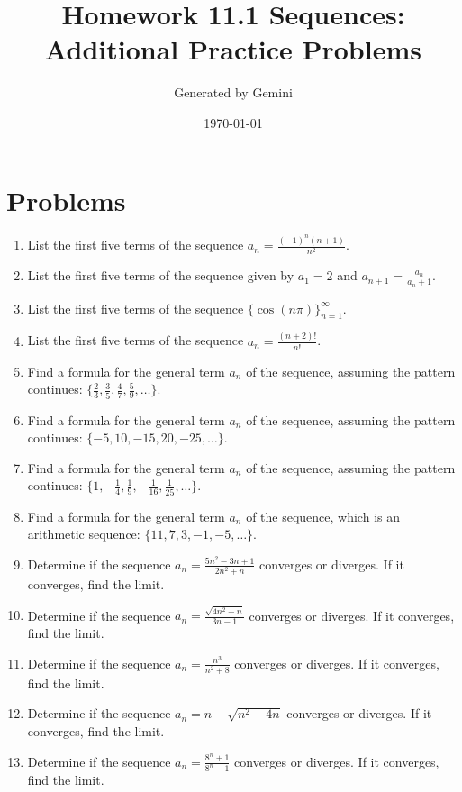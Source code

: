 \documentclass{article}
\title{Homework 11.1 Sequences: Additional Practice Problems}
\author{Generated by Gemini}
\date{\today}
\begin{document}
\maketitle

\section*{Problems}

\begin{enumerate}
    \item List the first five terms of the sequence $a_n = \frac{(-1)^n(n+1)}{n^2}$.
    \item List the first five terms of the sequence given by $a_1 = 2$ and $a_{n+1} = \frac{a_n}{a_n + 1}$.
    \item List the first five terms of the sequence $\{ \cos(n\pi) \}_{n=1}^{\infty}$.
    \item List the first five terms of the sequence $a_n = \frac{(n+2)!}{n!}$.

    \item Find a formula for the general term $a_n$ of the sequence, assuming the pattern continues: 
    $\{ \frac{2}{3}, \frac{3}{5}, \frac{4}{7}, \frac{5}{9}, \dots \}$.
    \item Find a formula for the general term $a_n$ of the sequence, assuming the pattern continues:
    $\{ -5, 10, -15, 20, -25, \dots \}$.
    \item Find a formula for the general term $a_n$ of the sequence, assuming the pattern continues:
    $\{ 1, -\frac{1}{4}, \frac{1}{9}, -\frac{1}{16}, \frac{1}{25}, \dots \}$.
    \item Find a formula for the general term $a_n$ of the sequence, which is an arithmetic sequence:
    $\{ 11, 7, 3, -1, -5, \dots \}$.

    \item Determine if the sequence $a_n = \frac{5n^2 - 3n + 1}{2n^2 + n}$ converges or diverges. If it converges, find the limit.
    \item Determine if the sequence $a_n = \frac{\sqrt{4n^2 + n}}{3n - 1}$ converges or diverges. If it converges, find the limit.
    \item Determine if the sequence $a_n = \frac{n^3}{n^2 + 8}$ converges or diverges. If it converges, find the limit.
    \item Determine if the sequence $a_n = n - \sqrt{n^2 - 4n}$ converges or diverges. If it converges, find the limit.
    \item Determine if the sequence $a_n = \frac{8^n + 1}{8^n - 1}$ converges or diverges. If it converges, find the limit.


\end{enumerate}
\end{document}
